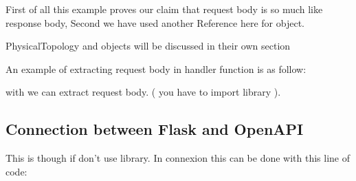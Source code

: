 \documentclass[letterpaper,10pt,english]{sphinxmanual}
\begin{document}
First of all this example proves our claim that request body is so much like response body,
Second we have used another Reference here for  object.

PhysicalTopology and  objects will be discussed in their own section

An example of extracting request body in handler function is as follow:

\begin{sphinxVerbatim}[commandchars=\\\{\}]
  
    
       

     
\end{sphinxVerbatim}

with  we can extract request body. ( you have to import  library ).


\subsection{Connection between Flask and OpenAPI}
\label{\detokenize{RestAPI:connection-between-flask-and-openapi}}
This is though if don’t use  library.
In connexion this can be done with this line of code:

\begin{sphinxVerbatim}[commandchars=\\\{\}]
  
                           
\end{sphinxVerbatim}
\end{document}

